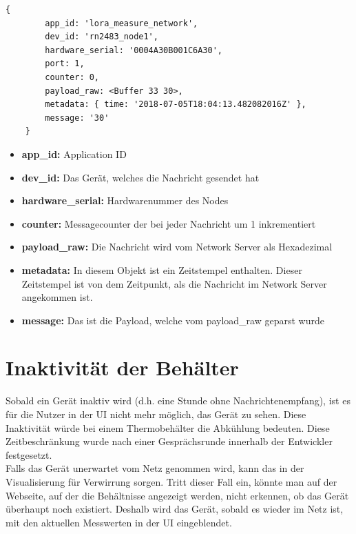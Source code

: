 \begin{lstlisting}[caption=Einkommender Messdatensatz,label=lst:payload]
    { 
        app_id: 'lora_measure_network',
        dev_id: 'rn2483_node1',
        hardware_serial: '0004A30B001C6A30',
        port: 1,
        counter: 0,
        payload_raw: <Buffer 33 30>,
        metadata: { time: '2018-07-05T18:04:13.482082016Z' },
        message: '30' 
    }
\end{lstlisting}
\begin{itemize}
    \item \textbf{app\_id:} Application ID
    \item \textbf{dev\_id:} Das Gerät, welches die Nachricht gesendet hat 
    \item \textbf{hardware\_serial:} Hardwarenummer des Nodes
    \item \textbf{counter:} Messagecounter der bei jeder Nachricht um 1 inkrementiert
    \item \textbf{payload\_raw:} Die Nachricht wird vom Network Server als Hexadezimal
    \item \textbf{metadata:} In diesem Objekt ist ein Zeitstempel enthalten. Dieser Zeitstempel ist von dem Zeitpunkt, als die Nachricht im Network Server angekommen ist.
    \item \textbf{message:} Das ist die Payload, welche vom payload\_raw geparst wurde 
\end{itemize} 
\newpage
\section{Inaktivität der Behälter}
Sobald ein Gerät inaktiv wird (d.h. eine Stunde ohne Nachrichtenempfang), ist es für die Nutzer in der UI nicht mehr möglich, das Gerät zu sehen. Diese Inaktivität würde bei einem Thermobehälter die Abkühlung bedeuten. Diese Zeitbeschränkung wurde nach einer Gesprächsrunde innerhalb der Entwickler festgesetzt.\\
Falls das Gerät unerwartet vom Netz genommen wird, kann das in der Visualisierung für Verwirrung sorgen. Tritt dieser Fall ein, könnte man auf der Webseite, auf der die Behältnisse angezeigt werden, nicht erkennen, ob das Gerät überhaupt noch existiert. Deshalb wird das Gerät, sobald es wieder im Netz ist, mit den aktuellen Messwerten in der UI eingeblendet. 

